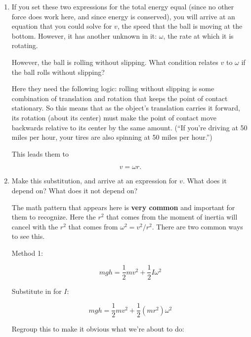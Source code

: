 \documentclass[12pt]{article}
\begin{document}
\begin{enumerate}
{{\begin{enumerate}
{    At the bottom, then, we have 
    
    $$E_{\rm{total}} = \frac{1}{2}mv^2 + \frac{1}{2}I \omega ^2.$$
    
    }
    
    \item If you set these two expressions for the total energy equal (since no other force does work here, and since energy is conserved), you will arrive at an equation that you could solve for $v$, the speed that the ball is moving at the bottom. However, it has another unknown in it: $\omega$, the rate at which it is rotating.
    
    However, the ball is rolling without slipping. What condition relates $v$ to $\omega$ if the ball rolls without slipping?
    
        {\color{red}
    Here they need the following logic: rolling without slipping is some combination of translation and rotation that keeps the point of contact stationary. So this means that as the object's translation carries it forward, its rotation (about its center) must make the point of contact move backwards relative to its center by the same amount. (``If you're driving at 50 miles per hour, your tires are also spinning at 50 miles per hour.'')
    
    This leads them to
    
    $$v = \omega r.$$
    	
    }
    
    
    
    \vspace{1in}
    \newpage
    
    \item Make this substitution, and arrive at an expression for $v$. What does it depend on? What does it not depend on?
    
          {\color{red}
    The math pattern that appears here is {\bf very common} and important for them to recognize. Here the $r^2$ that comes from the moment of inertia will cancel with the $r^2$ that comes from $\omega^2 = v^2/r^2$. There are two common ways to see this.
    }
    
    {\color{blue} Method 1:
    	
    	$$mgh = \frac{1}{2}mv^2 + \frac{1}{2}I \omega ^2$$
    	
    	Substitute in for $I$:
    	
    	$$mgh = \frac{1}{2}mv^2 + \frac{1}{2} \left(mr^2\right) \omega ^2$$
    	
    	Regroup this to make it obvious what we're about to do:
    	
}
\end{enumerate}}}
\end{enumerate}
\end{document}
